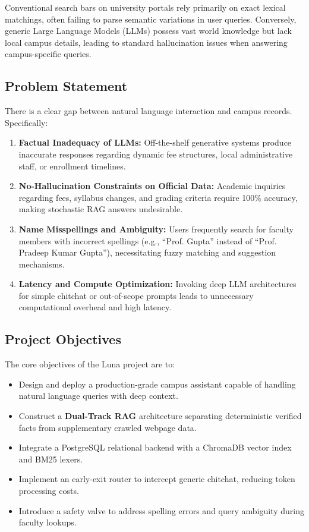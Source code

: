 \documentclass[12pt,a4paper]{article}
\begin{document}
Conventional search bars on university portals rely primarily on exact lexical matchings, often failing to parse semantic variations in user queries. Conversely, generic Large Language Models (LLMs) possess vast world knowledge but lack local campus details, leading to standard hallucination issues when answering campus-specific queries. 

\subsection{Problem Statement}
There is a clear gap between natural language interaction and campus records. Specifically:
\begin{enumerate}
    \item \textbf{Factual Inadequacy of LLMs:} Off-the-shelf generative systems produce inaccurate responses regarding dynamic fee structures, local administrative staff, or enrollment timelines.
    \item \textbf{No-Hallucination Constraints on Official Data:} Academic inquiries regarding fees, syllabus changes, and grading criteria require 100\% accuracy, making stochastic RAG answers undesirable.
    \item \textbf{Name Misspellings and Ambiguity:} Users frequently search for faculty members with incorrect spellings (e.g., ``Prof. Gupta'' instead of ``Prof. Pradeep Kumar Gupta''), necessitating fuzzy matching and suggestion mechanisms.
    \item \textbf{Latency and Compute Optimization:} Invoking deep LLM architectures for simple chitchat or out-of-scope prompts leads to unnecessary computational overhead and high latency.
\end{enumerate}

\subsection{Project Objectives}
The core objectives of the Luna project are to:
\begin{itemize}
    \item Design and deploy a production-grade campus assistant capable of handling natural language queries with deep context.
    \item Construct a \textbf{Dual-Track RAG} architecture separating deterministic verified facts from supplementary crawled webpage data.
    \item Integrate a PostgreSQL relational backend with a ChromaDB vector index and BM25 lexers.
    \item Implement an early-exit router to intercept generic chitchat, reducing token processing costs.
    \item Introduce a safety valve to address spelling errors and query ambiguity during faculty lookups.
\end{itemize}
\end{document}
